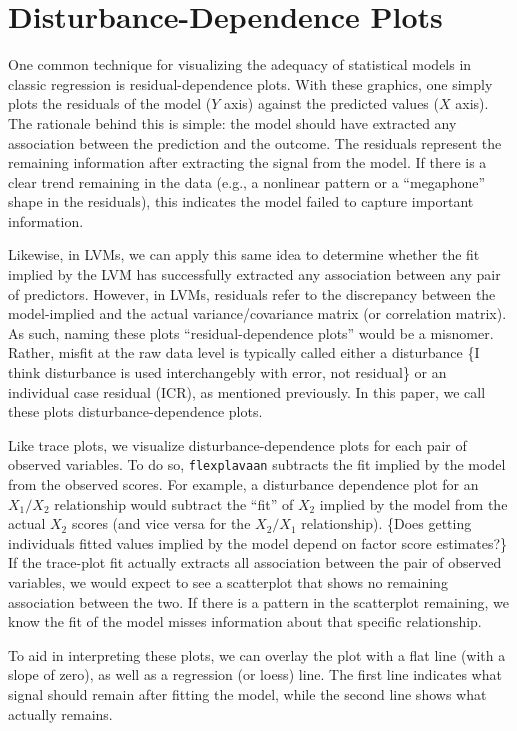 \documentclass[
  english,
  doc]{apa6}
\begin{document}
\hypertarget{disturbance-dependence-plots}{%
\section{Disturbance-Dependence Plots}\label{disturbance-dependence-plots}}

One common technique for visualizing the adequacy of statistical models in classic regression is residual-dependence plots. With these graphics, one simply plots the residuals of the model (\(Y\) axis) against the predicted values (\(X\) axis). The rationale behind this is simple: the model should have extracted any association between the prediction and the outcome. The residuals represent the remaining information after extracting the signal from the model. If there is a clear trend remaining in the data (e.g., a nonlinear pattern or a ``megaphone'' shape in the residuals), this indicates the model failed to capture important information.

Likewise, in LVMs, we can apply this same idea to determine whether the fit implied by the LVM has successfully extracted any association between any pair of predictors. However, in LVMs, residuals refer to the discrepancy between the model-implied and the actual variance/covariance matrix (or correlation matrix). As such, naming these plots ``residual-dependence plots'' would be a misnomer. Rather, misfit at the raw data level is typically called either a disturbance \{I think disturbance is used interchangebly with error, not residual\} or an individual case residual (ICR), as mentioned previously. In this paper, we call these plots disturbance-dependence plots.

Like trace plots, we visualize disturbance-dependence plots for each pair of observed variables. To do so, \texttt{flexplavaan} subtracts the fit implied by the model from the observed scores. For example, a disturbance dependence plot for an \(X_1/X_2\) relationship would subtract the ``fit'' of \(X_2\) implied by the model from the actual \(X_2\) scores (and vice versa for the \(X_2/X_1\) relationship). \{Does getting individuals fitted values implied by the model depend on factor score estimates?\} If the trace-plot fit actually extracts all association between the pair of observed variables, we would expect to see a scatterplot that shows no remaining association between the two. If there is a pattern in the scatterplot remaining, we know the fit of the model misses information about that specific relationship.

To aid in interpreting these plots, we can overlay the plot with a flat line (with a slope of zero), as well as a regression (or loess) line. The first line indicates what signal should remain after fitting the model, while the second line shows what actually remains.
\end{document}
